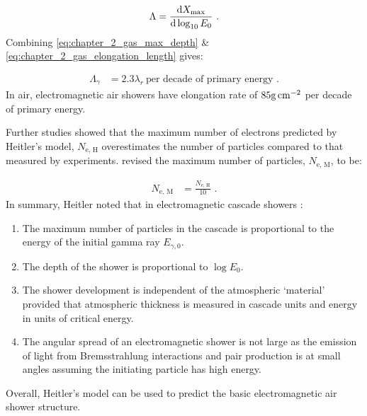 \begin{equation}
    \begin{aligned}
    \Lambda=\dv{X_\text{max}}{\log_{10}E_0} \text{ .}
    \end{aligned} \label{eq:chapter_2_gas_elongation_length}
\end{equation}
\noindent Combining \autoref{eq:chapter_2_gas_max_depth} \& \ref{eq:chapter_2_gas_elongation_length} gives:

\begin{equation}
    \begin{aligned}
    \Lambda_\gamma &= 2.3\lambda_r ~ \text{per decade of primary energy}\text{ .}
    \end{aligned}
\end{equation}
\noindent In air, electromagnetic air showers have elongation rate of $85\si{\gram\per\centi\meter\squared}$ per decade of primary energy.
\newpar

Further studies \citep{MATTHEWS2005387} showed that the maximum number of electrons predicted by Heitler's model, $N_\text{e, H}$ overestimates the number of particles compared to that measured by experiments. \cite{MATTHEWS2005387} revised the maximum number of particles, $N_\text{e, M}$, to be:

\begin{equation}
    \begin{aligned}
    N_\text{e, M} &= \frac{N_\text{e, H}}{10} \text{ .}
    \end{aligned} \label{eq:chapter_2_gas_e_correction_factor}
\end{equation}
\noindent In summary, Heitler noted that in electromagnetic cascade showers \citep{1954qtr..book.....H}:

\begin{enumerate}
    \itemsep0em
	\item The maximum number of particles in the cascade is proportional to the energy of the initial gamma ray $E_{\gamma,0}$.
	\item The depth of the shower is proportional to $\log E_0$.
	\item The shower development is independent of the atmospheric `material' provided that atmospheric thickness is measured in cascade units and energy in units of critical energy.
    \item The angular spread of an electromagnetic shower is not large as the emission of light from Bremsstrahlung interactions and pair production is at small angles assuming the initiating particle has high energy.
\end{enumerate}
\noindent Overall, Heitler's model can be used to predict the basic electromagnetic air shower structure.

